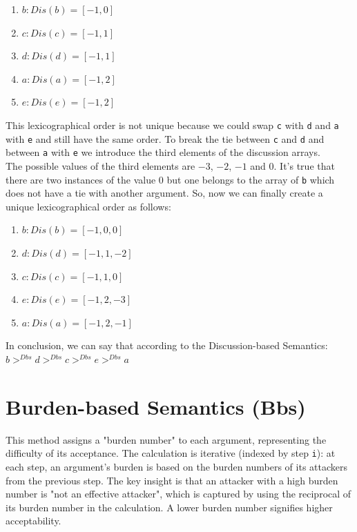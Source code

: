 \documentclass{scrbook}
\begin{document}
\begin{enumerate}
    \item 
    $b: Dis(b)=[-1,0]$

    \item 
    $c: Dis(c)=[-1,1]$

    \item 
    $d: Dis(d)=[-1,1]$

    \item 
    $a: Dis(a)=[-1,2]$

    \item 
    $e: Dis(e)=[-1,2]$
\end{enumerate}

This lexicographical order is not unique because we could swap \texttt{c} with \texttt{d} and \texttt{a} with \texttt{e} and still have the same order. To break the tie between \texttt{c} and \texttt{d} and between \texttt{a} with \texttt{e} we introduce the third elements of the discussion arrays. \\

The possible values of the third elements are $-3$, $-2$, $-1$ and $0$. It's true that there are two instances of the value $0$ but one belongs to the array of \texttt{b} which does not have a tie with another argument. So, now we can finally create a unique lexicographical order as follows:

\begin{enumerate}
    \item 
    $b: Dis(b)=[-1,0,0]$

    \item 
    $d: Dis(d)=[-1,1,-2]$

    \item 
    $c: Dis(c)=[-1,1,0]$

    \item 
    $e: Dis(e)=[-1,2,-3]$

    \item 
    $a: Dis(a)=[-1,2,-1]$
\end{enumerate}

In conclusion, we can say that according to the Discussion-based Semantics: \\

$b >^{Dbs} d >^{Dbs} c >^{Dbs} e >^{Dbs} a$

\section{Burden-based Semantics (Bbs)}

This method assigns a "burden number" to each argument, representing the difficulty of its acceptance. The calculation is iterative (indexed by step \texttt{i}): at each step, an argument's burden is based on the burden numbers of its attackers from the previous step. The key insight is that an attacker with a high burden number is "not an effective attacker", which is captured by using the reciprocal of its burden number in the calculation. A lower burden number signifies higher acceptability. \\
\end{document}

